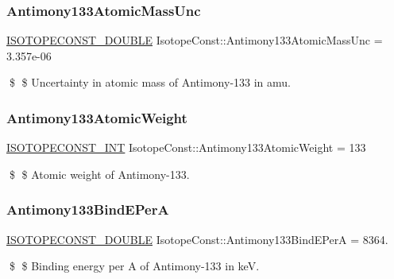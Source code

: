\subsubsection{\texorpdfstring{Antimony133\+Atomic\+Mass\+Unc}{Antimony133AtomicMassUnc}}
{\footnotesize\ttfamily \mbox{\hyperlink{group___isotope_const-_macros_ga8f45a7272ce02c0b4c65c44636ed719a}{I\+S\+O\+T\+O\+P\+E\+C\+O\+N\+S\+T\+\_\+\+D\+O\+U\+B\+LE}} Isotope\+Const\+::\+Antimony133\+Atomic\+Mass\+Unc = 3.\+357e-\/06}

\$ \$ Uncertainty in atomic mass of Antimony-\/133 in amu. \mbox{\label{group___isotope_const-_antimony-_sb133_gac665d8c6a6a96188f4e2e8cf63cbe897}} 
\subsubsection{\texorpdfstring{Antimony133\+Atomic\+Weight}{Antimony133AtomicWeight}}
{\footnotesize\ttfamily \mbox{\hyperlink{group___isotope_const-_macros_ga5f18360b3e99483a35c32d789e62621c}{I\+S\+O\+T\+O\+P\+E\+C\+O\+N\+S\+T\+\_\+\+I\+NT}} Isotope\+Const\+::\+Antimony133\+Atomic\+Weight = 133}

\$ \$ Atomic weight of Antimony-\/133. \mbox{\label{group___isotope_const-_antimony-_sb133_gab6dc6f4c0eba6b779cbe75ec0766731e}} 
\subsubsection{\texorpdfstring{Antimony133\+Bind\+E\+PerA}{Antimony133BindEPerA}}
{\footnotesize\ttfamily \mbox{\hyperlink{group___isotope_const-_macros_ga8f45a7272ce02c0b4c65c44636ed719a}{I\+S\+O\+T\+O\+P\+E\+C\+O\+N\+S\+T\+\_\+\+D\+O\+U\+B\+LE}} Isotope\+Const\+::\+Antimony133\+Bind\+E\+PerA = 8364.}

\$ \$ Binding energy per A of Antimony-\/133 in keV. \mbox{\label{group___isotope_const-_antimony-_sb133_gaf8b1582353d0f23dd9b2b78333ee6e88}} 
